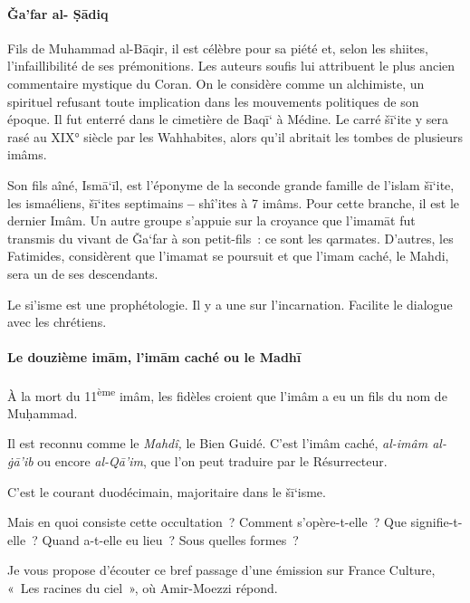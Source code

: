  
\paragraph{Ǧa'far al- Ṣādiq
}\label{ux1e7afar-al--ux1e63ux101diq}

Fils de Muhammad al-Bāqir, il est célèbre pour sa piété et, selon les
shiites, l'infaillibilité de ses prémonitions. Les auteurs soufis lui
attribuent le plus ancien commentaire mystique du Coran. On le considère
comme un alchimiste, un spirituel refusant toute implication dans les
mouvements politiques de son époque. Il fut enterré dans le cimetière de
Baqī` à Médine. Le carré šī`ite y sera rasé au XIX° siècle par les
Wahhabites, alors qu'il abritait les tombes de plusieurs imâms.

Son fils aîné, Ismā`īl, est l'éponyme de la seconde grande famille de
l'islam šī`ite, les ismaéliens, šī`ites septimains \textbf{--} shî'ites
à 7 imâms. Pour cette branche, il est le dernier Imâm. Un autre groupe
s'appuie sur la croyance que l'imamāt fut transmis du vivant de Ǧa`far à
son petit-fils~: ce sont les qarmates. D'autres, les Fatimides,
considèrent que l'imamat se poursuit et que l'imam caché, le Mahdi, sera
un de ses descendants.


\begin{Synthesis}
Le si'isme est  une prophétologie. Il y a une sur
l'incarnation. Facilite le
dialogue avec les chrétiens.
\end{Synthesis}

 
\paragraph{{Le douzième imām, l'imām caché ou
le Madhī
}{ }}\label{le-douziuxe8me-imux101m-limux101m-cachuxe9-ou-le-madhux12b}

À la mort du 11\textsuperscript{ème} imâm, les fidèles croient que
l'imâm a eu un fils du nom de Muḥammad. 
\begin{Def}[Mahdî]
Il est reconnu comme le
\emph{Mahdî,} le Bien Guidé. C'est l'imâm caché, \emph{al-imâm al-ġā'ib}
ou encore \emph{al-Qā'im}, que l'on peut traduire par le Résurrecteur.
\end{Def}


C'est le courant duodécimain, majoritaire dans le šī`isme.

Mais en quoi consiste cette occultation~? Comment s'opère-t-elle~? Que
signifie-t-elle~? Quand a-t-elle eu lieu~? Sous quelles formes~?

Je vous propose d'écouter ce bref passage d'une émission sur France
Culture, «~Les racines du ciel~», où Amir-Moezzi répond.

